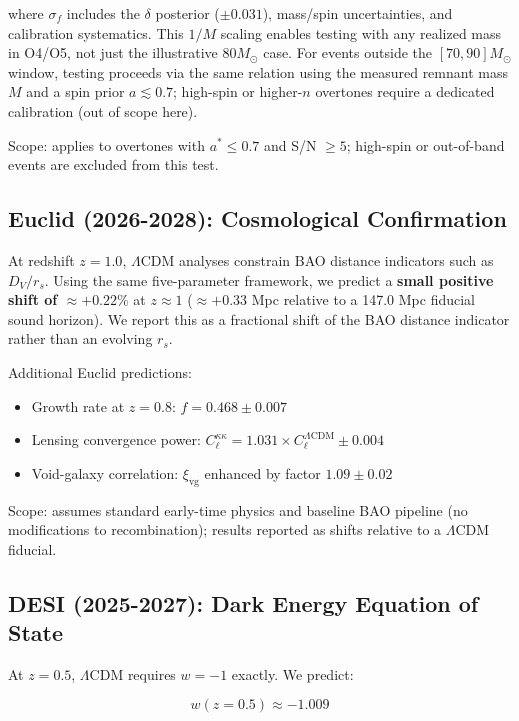 where $\sigma_f$ includes the $\delta$ posterior ($\pm0.031$), mass/spin uncertainties, and calibration systematics. This $1/M$ scaling enables testing with any realized mass in O4/O5, not just the illustrative $80 M_\odot$ case. For events outside the $[70,90] M_\odot$ window, testing proceeds via the same relation using the measured remnant mass $M$ and a spin prior $a \lesssim 0.7$; high-spin or higher-$n$ overtones require a dedicated calibration (out of scope here).

Scope: applies to overtones with $a^* \leq 0.7$ and S/N $\geq 5$; high-spin or out-of-band events are excluded from this test.

\subsection{Euclid (2026-2028): Cosmological Confirmation}

At redshift $z = 1.0$, $\Lambda$CDM analyses constrain BAO distance indicators such as $D_V/r_s$. Using the same five-parameter framework, we predict a \textbf{small positive shift of $\approx +0.22\%$} at $z \approx 1$ ($\approx +0.33$ Mpc relative to a 147.0 Mpc fiducial sound horizon). We report this as a fractional shift of the BAO distance indicator rather than an evolving $r_s$.

Additional Euclid predictions:

\begin{itemize}
\item Growth rate at $z = 0.8$: $f = 0.468 \pm 0.007$
\item Lensing convergence power: $C_\ell^{\kappa\kappa} = 1.031 \times C_\ell^{\Lambda\text{CDM}} \pm 0.004$
\item Void-galaxy correlation: $\xi_{\text{vg}}$ enhanced by factor $1.09 \pm 0.02$
\end{itemize}

Scope: assumes standard early-time physics and baseline BAO pipeline (no modifications to recombination); results reported as shifts relative to a $\Lambda$CDM fiducial.

\subsection{DESI (2025-2027): Dark Energy Equation of State}

At $z = 0.5$, $\Lambda$CDM requires $w = -1$ exactly. We predict:

\begin{equation}
w(z=0.5) \approx -1.009
\end{equation}

